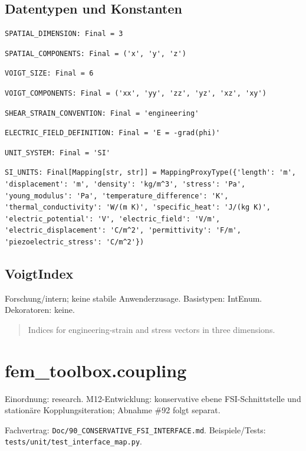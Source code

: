 \subsection*{Datentypen und Konstanten}
\begin{lstlisting}
SPATIAL_DIMENSION: Final = 3
\end{lstlisting}
\begin{lstlisting}
SPATIAL_COMPONENTS: Final = ('x', 'y', 'z')
\end{lstlisting}
\begin{lstlisting}
VOIGT_SIZE: Final = 6
\end{lstlisting}
\begin{lstlisting}
VOIGT_COMPONENTS: Final = ('xx', 'yy', 'zz', 'yz', 'xz', 'xy')
\end{lstlisting}
\begin{lstlisting}
SHEAR_STRAIN_CONVENTION: Final = 'engineering'
\end{lstlisting}
\begin{lstlisting}
ELECTRIC_FIELD_DEFINITION: Final = 'E = -grad(phi)'
\end{lstlisting}
\begin{lstlisting}
UNIT_SYSTEM: Final = 'SI'
\end{lstlisting}
\begin{lstlisting}
SI_UNITS: Final[Mapping[str, str]] = MappingProxyType({'length': 'm', 'displacement': 'm', 'density': 'kg/m^3', 'stress': 'Pa', 'young_modulus': 'Pa', 'temperature_difference': 'K', 'thermal_conductivity': 'W/(m K)', 'specific_heat': 'J/(kg K)', 'electric_potential': 'V', 'electric_field': 'V/m', 'electric_displacement': 'C/m^2', 'permittivity': 'F/m', 'piezoelectric_stress': 'C/m^2'})
\end{lstlisting}
\subsection{VoigtIndex}
Forschung/intern; keine stabile Anwenderzusage.
Basistypen: IntEnum. Dekoratoren: keine.
\begin{quote}
Indices for engineering-strain and stress vectors in three dimensions.
\end{quote}
\section{fem\_toolbox.coupling}
Einordnung: research. M12-Entwicklung: konservative ebene FSI-Schnittstelle und stationäre Kopplungsiteration; Abnahme \#92 folgt separat.
\par Fachvertrag: \nolinkurl{Doc/90_CONSERVATIVE_FSI_INTERFACE.md}. Beispiele/Tests:
\nolinkurl{tests/unit/test_interface_map.py}.
